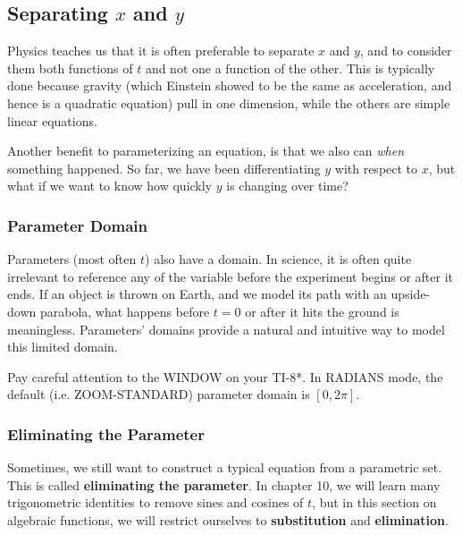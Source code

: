 
\subsection{Separating $x$ and $y$}



Physics teaches us that it is often preferable to separate $x$ and $y$, and to
consider them both functions of $t$ and not one a function of the other.  This is 
typically done because gravity (which Einstein showed to be the same as 
acceleration, and hence is a quadratic equation) pull in one dimension, while
the others are simple linear equations.

Another benefit to parameterizing an equation, is that we also can \emph{when}
something happened.  So far, we have been differentiating $y$ with respect to 
$x$, but what if we want to know how quickly $y$ is changing over time?


\subsubsection{Parameter Domain}
Parameters (most often $t$) also have a domain.  In science, it is often quite
irrelevant to reference any of the variable before the experiment begins or
after it ends.  If an object is thrown on Earth, and we model its path with an
upside-down parabola, what happens before $t=0$ or after it hits the ground
is meaningless.  Parameters' domains provide a natural and intuitive way to
model this limited domain. 

Pay careful attention to the WINDOW on your TI-8*.  In RADIANS mode, the
default (i.e. ZOOM-STANDARD) parameter domain is $[0,2\pi]$.

\subsubsection{Eliminating the Parameter}
Sometimes, we still want to construct a typical equation from a parametric 
set.  This is called \textbf{eliminating the parameter}.  In chapter 10, we will
learn many trigonometric identities to remove sines and cosines of $t$, but in 
this section on algebraic functions, we will restrict ourselves to
\textbf{substitution} and \textbf{elimination}.

